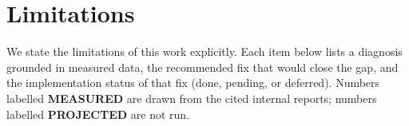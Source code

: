 
\section{Limitations}\label{sec:limitations}

We state the limitations of this work explicitly. Each item below lists a
diagnosis grounded in measured data, the recommended fix that would close
the gap, and the implementation status of that fix (done, pending, or
deferred). Numbers labelled \textbf{MEASURED} are drawn from the cited
internal reports; numbers labelled \textbf{PROJECTED} are not run.

